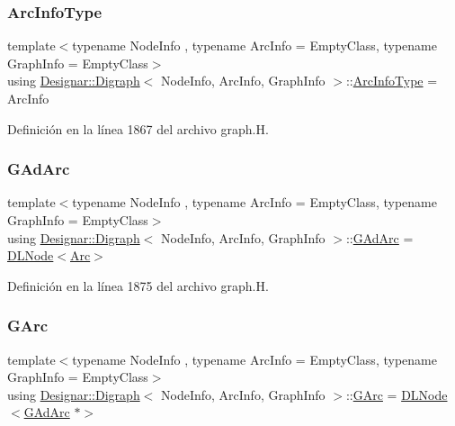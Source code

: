\subsubsection{\texorpdfstring{Arc\+Info\+Type}{ArcInfoType}}
{\footnotesize\ttfamily template$<$typename Node\+Info , typename Arc\+Info  = Empty\+Class, typename Graph\+Info  = Empty\+Class$>$ \\
using \hyperlink{class_designar_1_1_digraph}{Designar\+::\+Digraph}$<$ Node\+Info, Arc\+Info, Graph\+Info $>$\+::\hyperlink{class_designar_1_1_digraph_a84a736f6c32da0fcbd1d047e74264d00}{Arc\+Info\+Type} =  Arc\+Info}



Definición en la línea 1867 del archivo graph.\+H.

\mbox{\label{class_designar_1_1_digraph_a0c6d846f23d1e82556fb6055557df53f}} 
\subsubsection{\texorpdfstring{G\+Ad\+Arc}{GAdArc}}
{\footnotesize\ttfamily template$<$typename Node\+Info , typename Arc\+Info  = Empty\+Class, typename Graph\+Info  = Empty\+Class$>$ \\
using \hyperlink{class_designar_1_1_digraph}{Designar\+::\+Digraph}$<$ Node\+Info, Arc\+Info, Graph\+Info $>$\+::\hyperlink{class_designar_1_1_digraph_a0c6d846f23d1e82556fb6055557df53f}{G\+Ad\+Arc} =  \hyperlink{class_designar_1_1_d_l_node}{D\+L\+Node}$<$\hyperlink{class_designar_1_1_digraph_a0ceb278671f2a535c00fddccdeafd69f}{Arc}$>$\hspace{0.3cm}{\ttfamily [protected]}}



Definición en la línea 1875 del archivo graph.\+H.

\mbox{\label{class_designar_1_1_digraph_a341acf8fb0195a8986158c29c4db1a89}} 
\subsubsection{\texorpdfstring{G\+Arc}{GArc}}
{\footnotesize\ttfamily template$<$typename Node\+Info , typename Arc\+Info  = Empty\+Class, typename Graph\+Info  = Empty\+Class$>$ \\
using \hyperlink{class_designar_1_1_digraph}{Designar\+::\+Digraph}$<$ Node\+Info, Arc\+Info, Graph\+Info $>$\+::\hyperlink{class_designar_1_1_digraph_a341acf8fb0195a8986158c29c4db1a89}{G\+Arc} =  \hyperlink{class_designar_1_1_d_l_node}{D\+L\+Node}$<$\hyperlink{class_designar_1_1_digraph_a0c6d846f23d1e82556fb6055557df53f}{G\+Ad\+Arc} $\ast$$>$\hspace{0.3cm}{\ttfamily [protected]}}



